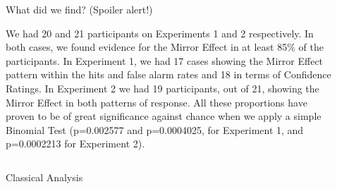 \documentclass[final]{beamer}
\newlength{\sepwid}
\newlength{\onecolwid}
\newlength{\twocolwid}
\begin{document}
\begin{frame}[t]
\begin{columns}[t]
\begin{column}{\onecolwid}

\end{column} %

\begin{column}{\sepwid}\end{column} %

\begin{column}{\twocolwid} %



\begin{alertblock}{What did we find? (Spoiler alert!)}

We had 20 and 21 participants on Experiments 1 and 2 respectively. In both cases, we found evidence for the Mirror Effect in at least 85\% of the participants. In Experiment 1, we had 17 cases showing the Mirror Effect pattern within the hits and false alarm rates and 18 in terms of Confidence Ratings. In Experiment 2 we had 19 participants, out of 21, showing the Mirror Effect in both patterns of response. All these proportions have proven to be of great significance against chance when we apply a simple Binomial Test (p=0.002577 and p=0.0004025, for Experiment 1, and p=0.0002213 for Experiment 2).

\end{alertblock} 

\begin{columns}[t,totalwidth=\twocolwid] %
\begin{column}{\onecolwid}\vspace{-.6in} %

\begin{alertblock}{Classical Analysis}


\end{alertblock}
\end{column}
\end{columns}
\end{column}
\end{columns}
\end{frame}
\end{document}
